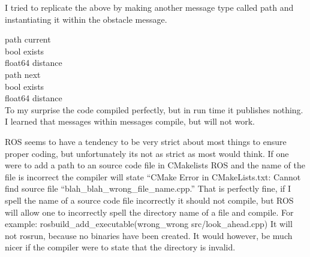 I tried to replicate the above by making another message type called path and instantiating it within the obstacle message.

path current\\
 bool exists\\
 float64 distance\\

path next\\
 bool exists\\
 float64 distance\\

To my surprise the code compiled perfectly, but in run time it publishes nothing. I learned that messages within messages compile, but will not work.

ROS seems to have a tendency to be very strict about most things to ensure proper coding, but unfortunately its not as strict as most would think. If one were to add a path to an source code file in CMakelists ROS and the name of the file is incorrect the compiler will state  ``CMake Error in CMakeLists.txt:
    Cannot find source file ``blah\_blah\_wrong\_file\_name.cpp.'' That is perfectly fine, if I spell the name of a source code file incorrectly it should not compile, but ROS will allow one to incorrectly spell the directory name of a file and compile. For example: rosbuild\_add\_executable(wrong\_wrong src/look\_ahead.cpp)
It will not rosrun, because no binaries have been created. It would however, be much nicer if the compiler were to state that the directory is invalid.
